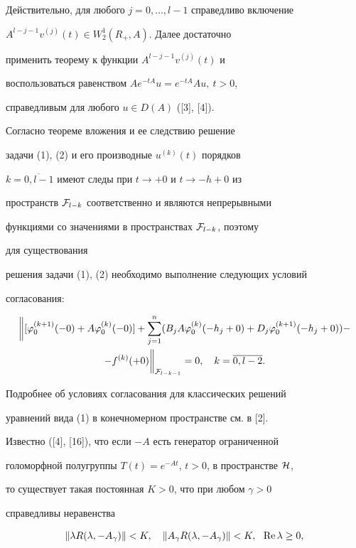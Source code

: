 Действительно, для любого $j=0,\dotsc,l-1$ справедливо включение


$A^{l-j-1}v^{(j)}(t)\in W^{1}_{2}(R_{+},A)$. Далее достаточно


применить теорему к функции $A^{l-j-1}v^{(j)}(t)$ и


воспользоваться равенством $Ae^{-tA}u=e^{-tA}Au,\ t>0$,


справедливым для любого $u\in D(A)$ ([3], [4]).





Согласно теореме вложения и ее следствию решение


задачи (1), (2) и его производные $u^{(k)}(t)$ порядков


$k=\overline{0,l-1}$ имеют следы при $t\to +0$ и $t\to -h+0$ из


пространств ${{\cal F}}_{l-k}$ соответственно и являются непрерывными


функциями со значениями в пространствах ${{\cal F}}_{l-k}$, поэтому


для существования


решения задачи (1), (2) необходимо выполнение следующих условий


согласования:


\begin{multline}


\bigg\|[\varphi^{(k+1)}_0(-0)+A\varphi^{(k)}_0(-0)]


+\sum\limits_{j=1}^n( B_j A\varphi^{(k)}_0(-h_j+0)+


D_j\varphi^{(k+1)}_0(-h_j+0))- \\ -


f^{(k)}(+0)\bigg\|_{{\pF}_{l-k-1}}=0,\quad k=\overline{0,l-2}.


\end{multline}


Подробнее об условиях согласования для классических решений


уравнений вида (1) в конечномерном пространстве см. в [2].





Известно ([4], [16]), что если $-A$ есть генератор ограниченной


голоморфной полугруппы $T(t)=e^{-At}$, $t>0$, в пространстве ${\cal H}$,


то существует такая постоянная $K>0$, что при любом $\gamma >0$


справедливы неравенства


\begin{equation}


\| \lambda R(\lambda ,-A_{\gamma })\| <K,


\quad \| A_{\gamma} R(\lambda,-A_{\gamma })\| <K, \ \ \re\lambda \geq0,


\end{equation}


